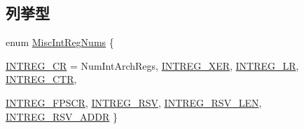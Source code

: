 \subsection*{列挙型}
\begin{DoxyCompactItemize}
\item 
enum \hyperlink{namespacePowerISA_a9969c99e14b7b491ae9e3751404cc6a1}{MiscIntRegNums} \{ \par
\hyperlink{namespacePowerISA_a9969c99e14b7b491ae9e3751404cc6a1a79e9736c7fb322ead9b19971e3cc056b}{INTREG\_\-CR} =  NumIntArchRegs, 
\hyperlink{namespacePowerISA_a9969c99e14b7b491ae9e3751404cc6a1ae6a531992e38e3a8471432458db39a9b}{INTREG\_\-XER}, 
\hyperlink{namespacePowerISA_a9969c99e14b7b491ae9e3751404cc6a1a16ad869dde5202f3570c4f6b7fe33440}{INTREG\_\-LR}, 
\hyperlink{namespacePowerISA_a9969c99e14b7b491ae9e3751404cc6a1a84d0734633f7e5576d1dbdbac88e111d}{INTREG\_\-CTR}, 
\par
\hyperlink{namespacePowerISA_a9969c99e14b7b491ae9e3751404cc6a1af24363447addc48de14b9ed1ca9a8617}{INTREG\_\-FPSCR}, 
\hyperlink{namespacePowerISA_a9969c99e14b7b491ae9e3751404cc6a1ac6ab3bece297fc03ad48e1f2e54c2814}{INTREG\_\-RSV}, 
\hyperlink{namespacePowerISA_a9969c99e14b7b491ae9e3751404cc6a1a0d4c3467b31d839eddc5fee40218ae58}{INTREG\_\-RSV\_\-LEN}, 
\hyperlink{namespacePowerISA_a9969c99e14b7b491ae9e3751404cc6a1a5872a0b2feef4ede9d5614db9649c648}{INTREG\_\-RSV\_\-ADDR}
 \}
\end{DoxyCompactItemize}
